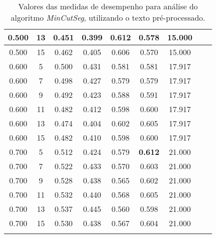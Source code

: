 \begin{longtable}[c]{|c|c|c|c|c|c|c|c|c|}
 0.500 & 13 & 0.451 & 0.399 & 0.612 & 0.578 & 15.000  \\ \hline 
 0.500 & 15 & 0.462 & 0.405 & 0.606 & 0.570 & 15.000  \\ \hline 
 0.600 & 5 & 0.500 & 0.431 & 0.581 & 0.581 & 17.917  \\ \hline 
 0.600 & 7 & 0.498 & 0.427 & 0.579 & 0.579 & 17.917  \\ \hline 
 0.600 & 9 & 0.492 & 0.423 & 0.588 & 0.591 & 17.917  \\ \hline 
 0.600 & 11 & 0.482 & 0.412 & 0.598 & 0.600 & 17.917  \\ \hline 
 0.600 & 13 & 0.474 & 0.404 & 0.602 & 0.605 & 17.917  \\ \hline 
 0.600 & 15 & 0.482 & 0.410 & 0.598 & 0.600 & 17.917  \\ \hline 
 0.700 & 5 & 0.512 & 0.424 & 0.579 & \cellcolor{gray!20} \textbf{0.612} & 21.000  \\ \hline 
 0.700 & 7 & 0.522 & 0.433 & 0.570 & 0.603 & 21.000  \\ \hline 
 0.700 & 9 & 0.528 & 0.438 & 0.565 & 0.602 & 21.000  \\ \hline 
 0.700 & 11 & 0.532 & 0.440 & 0.568 & 0.605 & 21.000  \\ \hline 
 0.700 & 13 & 0.537 & 0.445 & 0.560 & 0.598 & 21.000  \\ \hline 
 0.700 & 15 & 0.530 & 0.438 & 0.567 & 0.604 & 21.000  \\ \hline 
 \caption{Valores das medidas de desempenho para análise do algoritmo \textit{MinCutSeg}, utilizando o texto pré-processado.}
 \end{longtable} 







\newpage


